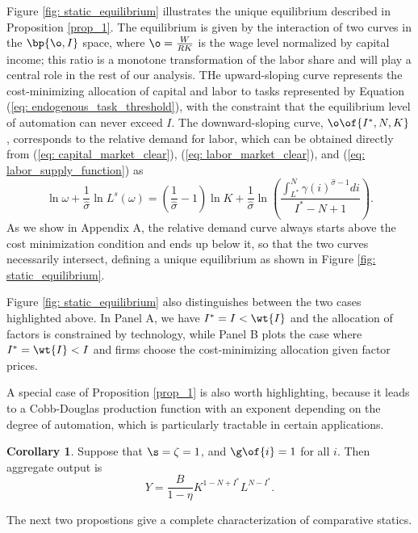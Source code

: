 \documentclass[12pt]{article}
\theoremstyle{definition}
\newtheorem{corollary}[theorem]{Corollary}
\begin{document}
Figure \ref{fig: static_equilibrium} illustrates the unique equilibrium described in Proposition \ref{prop_1}. The equilibrium is given by the interaction of two curves in the $\bp{\o, I}$ space, where $\o = \frac{W}{RK}$ is the wage level normalized by capital income; this ratio is a monotone transformation of the labor share and will play a central role in the rest of our analysis. THe upward-sloping curve represents the cost-minimizing allocation of capital and labor to tasks represented by Equation (\ref{eq: endogenous_task_threshold}), with the constraint that the equilibrium level of automation can never exceed $I$. The downward-sloping curve, $\o\of{I^*, N, K}$, corresponds to the relative demand for labor, which can be obtained directly from (\ref{eq: capital_market_clear}), (\ref{eq: labor_market_clear}), and (\ref{eq: labor_supply_function}) as 
\begin{equation}
    \label{eq: normalized_wage_income}
    \ln \omega+\frac{1}{\widehat{\sigma}} \ln L^s(\omega)=\left(\frac{1}{\widehat{\sigma}}-1\right) \ln K+\frac{1}{\widehat{\sigma}} \ln \left(\frac{\int_{L^*}^N \gamma(i)^{\widehat{\sigma}-1} d i}{I^*-N+1}\right).
\end{equation}
As we show in Appendix A, the relative demand curve always starts above the cost minimization condition and ends up below it, so that the two curves necessarily intersect, defining a unique equilibrium as shown in Figure \ref{fig: static_equilibrium}.

Figure \ref{fig: static_equilibrium} also distinguishes between the two cases highlighted above. In Panel A, we have $I^* = I < \wt{I}$ and the allocation of factors is constrained by technology, while Panel B plots the case where $I^* = \wt{I} < I$ and firms choose the cost-minimizing allocation given factor prices.

A special case of Proposition \ref{prop_1} is also worth highlighting, because it leads to a Cobb-Douglas production function with an exponent depending on the degree of automation, which is particularly tractable in certain applications.

\begin{corollary}
    Suppose that $\s = \zeta = 1$, and $\g\of{i} = 1$ for all $i$. Then aggregate output is 
    $$
    Y = \frac{B}{1 - \eta} K^{1 - N + I^*} L^{N - I^*}.
    $$
\end{corollary}

The next two propostions give a complete characterization of comparative statics. 
\end{document}
